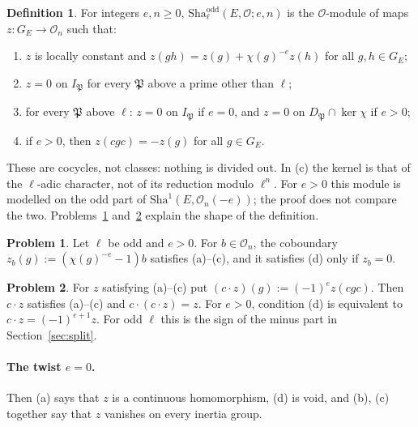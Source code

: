 \documentclass[reqno]{amsart}
\theoremstyle{definition}
\newtheorem{problem}{Problem}[section]
\newtheorem{definition}{Definition}[section]
\theoremstyle{plain}
\theoremstyle{remark}
\newcommand{\Oc}{\mathcal{O}}
\newcommand{\Sha}{\mathrm{Sha}}
\newcommand{\Shao}{\Sha^{\mathrm{odd}}}
\begin{document}
\begin{definition}\label{def:shaodd}
For integers \(e, n \ge 0\), \(\Shao_\ell(E, \Oc; e, n)\) is the \(\Oc\)-module of maps \(z \colon G_E \to \Oc_n\) such that:
\begin{enumerate}
\item[(a)] \(z\) is locally constant and \(z(gh) = z(g) + \chi(g)^{-e} z(h)\) for all \(g, h \in G_E\);
\item[(b)] \(z = 0\) on \(I_{\mathfrak{P}}\) for every \(\mathfrak{P}\) above a prime other than \(\ell\);
\item[(c)] for every \(\mathfrak{P}\) above \(\ell\): \(z = 0\) on \(I_{\mathfrak{P}}\) if \(e = 0\), and \(z = 0\) on \(D_{\mathfrak{P}} \cap \ker \chi\) if \(e > 0\);
\item[(d)] if \(e > 0\), then \(z(cgc) = -z(g)\) for all \(g \in G_E\).
\end{enumerate}
\end{definition}

These are cocycles, not classes: nothing is divided out.  In (c) the kernel is that of the \(\ell\)-adic character, not of its reduction modulo \(\ell^n\).  For \(e > 0\) this module is modelled on the odd part of \(\Sha^1(E,\Oc_n(-e))\); the proof does not compare the two.  Problems~\ref{pr:cob-odd} and~\ref{pr:c-action} explain the shape of the definition.

\begin{problem}\label{pr:cob-odd}
Let \(\ell\) be odd and \(e > 0\).  For \(b \in \Oc_n\), the coboundary \(z_b(g) := (\chi(g)^{-e} - 1) b\) satisfies (a)--(c), and it satisfies (d) only if \(z_b = 0\).
\end{problem}

\begin{problem}\label{pr:c-action}
For \(z\) satisfying (a)--(c) put \((c \cdot z)(g) := (-1)^e z(cgc)\).  Then \(c \cdot z\) satisfies (a)--(c) and \(c \cdot (c \cdot z) = z\).  For \(e > 0\), condition (d) is equivalent to \(c \cdot z = (-1)^{e+1}z\).  For odd \(\ell\) this is the sign of the minus part in Section~\ref{sec:split}.
\end{problem}

\paragraph{The twist \(e = 0\).}
Then (a) says that \(z\) is a continuous homomorphism, (d) is void, and (b), (c) together say that \(z\) vanishes on every inertia group.
\end{document}
